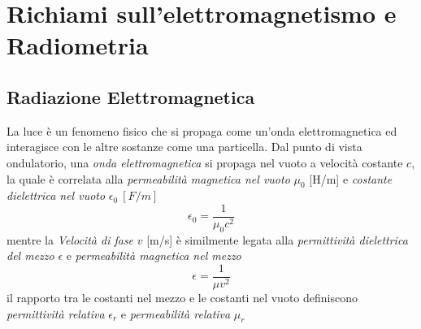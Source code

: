 \chapter{Richiami sull'elettromagnetismo e Radiometria}
\section{Radiazione Elettromagnetica}
La luce \`e un fenomeno fisico che si propaga come un'onda elettromagnetica ed interagisce con le altre sostanze come una particella. Dal punto di 
vista ondulatorio, una \textit{onda elettromagnetica} si propaga nel vuoto a velocit\`a costante $c$, la quale \`e correlata alla
\textit{permeabilit\`a magnetica nel vuoto} $\mu_0$ [\si{H/m}] e \textit{costante dielettrica nel vuoto} $\epsilon_0\ [\si{F/m}]$
\[ \epsilon_0 = \frac{1}{\mu_0 c^2} \]
mentre la \textit{Velocit\`a di fase} $v$ [\si{m/s}] \`e similmente legata alla \textit{permittivit\`a dielettrica del mezzo} $\epsilon$ e 
\textit{permeabilit\`a magnetica nel mezzo}
\[ \epsilon = \frac{1}{\mu v^2} \]
il rapporto tra le costanti nel mezzo e le costanti nel vuoto definiscono \textit{permittivit\`a relativa} $\epsilon_r$ e 
\textit{permeabilit\`a relativa} $\mu_r$\par
%
